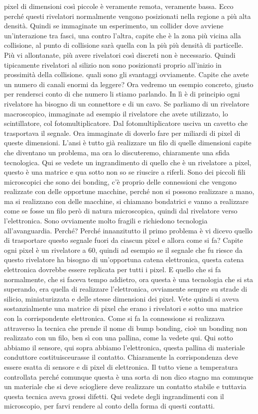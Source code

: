{pixel di dimensioni così piccole è veramente remota, veramente bassa. Ecco perché questi rivelatori normalmente vengono posizionati nella regione a più alta densità. Quindi se immaginate un esperimento, un collider dove avviene un'interazione tra fasci, una contro l'altra, capite che è la zona più vicina alla collisione, al punto di collisione sarà quella con la più più densità di particelle. Più vi allontanate, più avere rivelatori così discreti non è necessario. Quindi tipicamente rivelatori al silizio non sono posizionati proprio all'inizio in prossimità della collisione. quali sono gli svantaggi ovviamente. Capite che avete un numero di canali enormi da leggere? Ora vedremo un esempio concreto, giusto per rendersci conto di che numero li stiamo parlando. In lì è di principio ogni rivelatore ha bisogno di un connettore e di un cavo. Se parliamo di un rivelatore macroscopico, immaginate ad esempio il rivelatore che avete utilizzato, lo scintillatore, col fotomultiplicatore. Dal fotomultiplicatore usciva un cavetto che trasportava il segnale. Ora immaginate di doverlo fare per miliardi di pixel di queste dimensioni. L'ansi è tutto già realizzare un filo di quelle dimensioni capite che diventano un problema, ma ora lo discuteremo, chiaramente una sfida tecnologica. Qui se vedete un ingrandimento di quello che è un rivelatore a pixel, questo è una matrice e qua sotto non so se riuscire a riferli. Sono dei piccoli fili microscopici che sono dei bonding, c'è proprio delle connessioni che vengono realizzate con delle opportune macchine, perché non si possono realizzare a mano, ma si realizzano con delle macchine, si chiamano bondatrici e vanno a realizzare come se fosse un filo però di natura microscopica, quindi dal rivelatore verso l'elettronica. Sono ovviamente molto fragili e richiedono tecnologia all'avanguardia. Perché? Perché innanzitutto il primo problema è vi dicevo quello di trasportare questo segnale fuori da ciascun pixel e allora come si fa? Capite ogni pixel è un rivelatore a 60, quindi ad esempio se il segnale che fu riesce da questo rivelatore ha bisogno di un'opportuna catena elettronica, questa catena elettronica dovrebbe essere replicata per tutti i pixel. E quello che si fa normalmente, che si faceva tempo addietro, ora questa è una tecnologia che si sta superando, era quella di realizzare l'elettronica, ovviamente sempre su strade di silicio, miniaturizzata e delle stesse dimensioni dei pixel. Vete quindi si aveva sostanzialmente una matrice di pixel che erano i rivelatori e sotto una matrice con la corrispondente elettronica. Come si fa la connessione si realizzava attraverso la tecnica che prende il nome di bump bonding, cioè un bonding non realizzato con un filo, ben sì con una pallina, come la vedete qui. Qui sotto abbiamo il sensore, qui sopra abbiamo l'elettronica, questa pallina di materiale conduttore costituisceurasse il contatto. Chiaramente la corrispondenza deve essere esatta di sensore e di pixel di elettronica. Il tutto viene a temperatura controllata perché comunque questa è una sorta di non dico stagno ma comunque un materiale che si deve sciogliere deve realizzare un contatto stabile e tuttavia questa tecnica aveva grossi difetti. Qui vedete degli ingrandimenti con il microscopio, per farvi rendere al conto della forma di questi contatti. }
